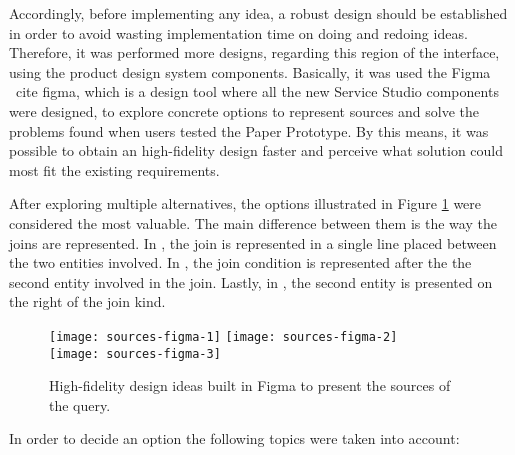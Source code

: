 Accordingly, before implementing any idea, a robust design should be established in order to avoid wasting implementation time on doing and redoing ideas. Therefore, it was performed more designs, regarding this region of the interface, using the product design system components. Basically, it was used the Figma \ cite {figma}, which is a design tool where all the new Service Studio components were designed, to explore concrete options to represent sources and solve the problems found when users tested the Paper Prototype. By this means, it was possible to obtain an high-fidelity design faster and perceive what solution could most fit the existing requirements.

After exploring multiple alternatives, the options illustrated in Figure \ref{fig:sourcesFigma} were considered the most valuable. The main difference between them is the way the joins are represented. In , the join is represented in a single line placed between the two entities involved. In , the join condition is represented after the the second entity involved in the join. Lastly, in , the second entity is presented on the right of the join kind.

\begin{figure}[tb]
  \centering
    {\texttt{[image: sources-figma-1]}}%
    {\texttt{[image: sources-figma-2]}}%
    \\
  {\texttt{[image: sources-figma-3]}}%
\caption{High-fidelity design ideas built in Figma to present the sources of the query.}
  \label{fig:sourcesFigma}
\end{figure}

In order to decide an option the following topics were taken into account:


